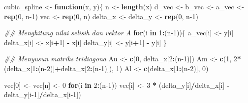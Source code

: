 \documentclass[]{book}
\newenvironment{Shaded}{\begin{snugshade}}{\end{snugshade}}
\newcommand{\CommentTok}[1]{\textcolor[rgb]{0.56,0.35,0.01}{\textit{#1}}}
\newcommand{\ControlFlowTok}[1]{\textcolor[rgb]{0.13,0.29,0.53}{\textbf{#1}}}
\newcommand{\DecValTok}[1]{\textcolor[rgb]{0.00,0.00,0.81}{#1}}
\newcommand{\KeywordTok}[1]{\textcolor[rgb]{0.13,0.29,0.53}{\textbf{#1}}}
\newcommand{\NormalTok}[1]{#1}
\newcommand{\OperatorTok}[1]{\textcolor[rgb]{0.81,0.36,0.00}{\textbf{#1}}}
\newcommand{\StringTok}[1]{\textcolor[rgb]{0.31,0.60,0.02}{#1}}
\theoremstyle{definition}
\theoremstyle{definition}
\theoremstyle{definition}
\theoremstyle{remark}
\begin{document}
\begin{Shaded}
\begin{Highlighting}[]
\NormalTok{cubic_spline <-}\StringTok{ }\ControlFlowTok{function}\NormalTok{(x, y)\{}
\NormalTok{  n <-}\StringTok{ }\KeywordTok{length}\NormalTok{(x)}
\NormalTok{  d_vec <-}\StringTok{ }\NormalTok{b_vec <-}\StringTok{ }\NormalTok{a_vec <-}\StringTok{ }\KeywordTok{rep}\NormalTok{(}\DecValTok{0}\NormalTok{, n}\DecValTok{-1}\NormalTok{)}
\NormalTok{  vec <-}\StringTok{ }\KeywordTok{rep}\NormalTok{(}\DecValTok{0}\NormalTok{, n)}
\NormalTok{  delta_x <-}\StringTok{ }\NormalTok{delta_y <-}\StringTok{ }\KeywordTok{rep}\NormalTok{(}\DecValTok{0}\NormalTok{, n}\DecValTok{-1}\NormalTok{)}
  
  \CommentTok{## Menghitung nilai selisih dan vektor A}
  \ControlFlowTok{for}\NormalTok{(i }\ControlFlowTok{in} \DecValTok{1}\OperatorTok{:}\NormalTok{(n}\DecValTok{-1}\NormalTok{))\{}
\NormalTok{    a_vec[i] <-}\StringTok{ }\NormalTok{y[i]}
\NormalTok{    delta_x[i] <-}\StringTok{ }\NormalTok{x[i}\OperatorTok{+}\DecValTok{1}\NormalTok{] }\OperatorTok{-}\StringTok{ }\NormalTok{x[i]}
\NormalTok{    delta_y[i] <-}\StringTok{ }\NormalTok{y[i}\OperatorTok{+}\DecValTok{1}\NormalTok{] }\OperatorTok{-}\StringTok{ }\NormalTok{y[i]}
\NormalTok{  \}}
  
  \CommentTok{## Menyusun matriks tridiagona}
\NormalTok{  Au <-}\StringTok{ }\KeywordTok{c}\NormalTok{(}\DecValTok{0}\NormalTok{, delta_x[}\DecValTok{2}\OperatorTok{:}\NormalTok{(n}\DecValTok{-1}\NormalTok{)])}
\NormalTok{  Am <-}\StringTok{ }\KeywordTok{c}\NormalTok{(}\DecValTok{1}\NormalTok{, }\DecValTok{2}\OperatorTok{*}\NormalTok{(delta_x[}\DecValTok{1}\OperatorTok{:}\NormalTok{(n}\DecValTok{-2}\NormalTok{)]}\OperatorTok{+}\NormalTok{delta_x[}\DecValTok{2}\OperatorTok{:}\NormalTok{(n}\DecValTok{-1}\NormalTok{)]), }\DecValTok{1}\NormalTok{)}
\NormalTok{  Al <-}\StringTok{ }\KeywordTok{c}\NormalTok{(delta_x[}\DecValTok{1}\OperatorTok{:}\NormalTok{(n}\DecValTok{-2}\NormalTok{)], }\DecValTok{0}\NormalTok{)}
  
\NormalTok{  vec[}\DecValTok{0}\NormalTok{] <-}\StringTok{ }\NormalTok{vec[n] <-}\StringTok{ }\DecValTok{0}
  \ControlFlowTok{for}\NormalTok{(i }\ControlFlowTok{in} \DecValTok{2}\OperatorTok{:}\NormalTok{(n}\DecValTok{-1}\NormalTok{))}
\NormalTok{    vec[i] <-}\StringTok{ }\DecValTok{3} \OperatorTok{*}\StringTok{ }\NormalTok{(delta_y[i]}\OperatorTok{/}\NormalTok{delta_x[i] }\OperatorTok{-}\StringTok{ }
\StringTok{                   }\NormalTok{delta_y[i}\DecValTok{-1}\NormalTok{]}\OperatorTok{/}\NormalTok{delta_x[i}\DecValTok{-1}\NormalTok{])}
  

\end{Highlighting}
\end{Shaded}
\end{document}
